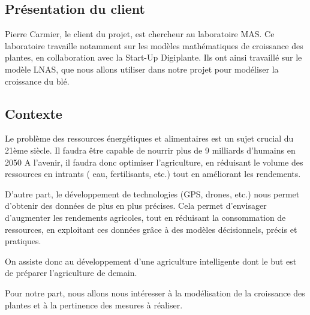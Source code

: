 \subsection{Présentation du client}
Pierre Carmier, le client du projet, est chercheur au laboratoire MAS. Ce laboratoire travaille notamment sur les modèles mathématiques de croissance des plantes, en collaboration avec la Start-Up Digiplante. Ils ont ainsi travaillé sur le modèle LNAS, que nous allons utiliser dans notre projet pour modéliser la croissance du blé.
\subsection{Contexte}
Le problème des ressources énergétiques et alimentaires est un sujet crucial du  21ème siècle. Il faudra être capable de nourrir plus de 9 milliards d'humains en 2050
A l'avenir, il faudra donc optimiser l'agriculture, en réduisant le volume des ressources en intrants ( eau, fertilisants, etc.) tout en améliorant les rendements.

D'autre part, le développement de technologies (GPS, drones, etc.) nous permet d'obtenir des données de plus en plus précises. 
Cela permet d'envisager d'augmenter les rendements agricoles, tout en réduisant la consommation de ressources, en exploitant ces données grâce à des modèles décisionnels, précis et pratiques. 

On assiste donc au développement d'une agriculture intelligente dont le but est de préparer
l'agriculture de demain.

Pour notre part, nous allons nous intéresser à la modélisation de la croissance des plantes et à la pertinence des mesures à réaliser.
